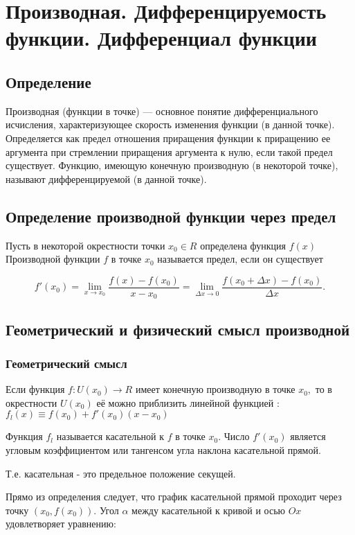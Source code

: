 \section{Производная. Дифференцируемость функции. Дифференциал функции}

\subsection{Определение}

Производная (функции в точке) — основное понятие дифференциального исчисления, характеризующее скорость изменения функции (в данной точке). Определяется как предел отношения приращения функции к приращению ее аргумента при стремлении приращения аргумента к нулю, если такой предел существует. Функцию, имеющую конечную производную (в некоторой точке), называют дифференцируемой (в данной точке).


\subsection{Определение производной функции через предел}

Пусть в некоторой окрестности точки $x_0 \in R$ определена функция $f(x)$ Производной функции $f$ в точке $x_0$ называется предел, если он существует

$$
f'(x_0) = \lim\limits_{x \to x_0} \frac{f(x) - f(x_0)}{x - x_0} = \lim\limits_{\Delta x \to 0} \frac{f(x_0+\Delta x)-f(x_0)}{\Delta x}.
$$

\subsection{Геометрический и физический смысл производной}

\subsubsection{Геометрический смысл }

Если функция $f\colon U(x_0) \to R$ имеет конечную производную в точке $x_0,$ то в окрестности $U(x_0)$ её можно приблизить линейной функцией
: $f_l(x) \equiv f(x_0) + f'(x_0)(x-x_0)$

Функция $f_l$ называется касательной к $f$ в точке $x_0$. Число $ f'(x_0) $ является угловым коэффициентом или тангенсом угла наклона касательной прямой.

Т.е. касательная  - это предельное положение секущей.


Прямо из определения следует, что график касательной прямой проходит через точку $(x_0, f(x_0))$. Угол $\alpha$ между касательной к кривой и осью $Ox$ удовлетворяет уравнению:


